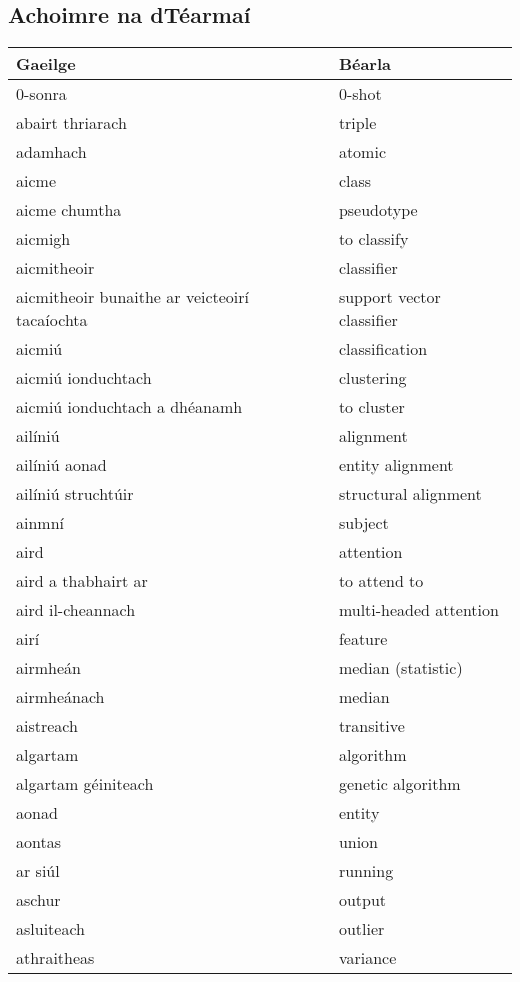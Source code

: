 \subsection{Achoimre na dTéarmaí}
\begin{longtable}{|l|l|}
	\hline
		\textbf{Gaeilge} & \textbf{Béarla}\\ \hline 
		0-sonra&0-shot\\ \hline 
		abairt thriarach&triple\\ \hline 
		adamhach&atomic\\ \hline 
		aicme&class\\ \hline 
		aicme chumtha&pseudotype\\ \hline 
		aicmigh&to classify\\ \hline 
		aicmitheoir&classifier\\ \hline 
		aicmitheoir bunaithe ar veicteoirí tacaíochta&support vector classifier\\ \hline 
		aicmiú&classification\\ \hline 
		aicmiú ionduchtach&clustering\\ \hline 
		aicmiú ionduchtach a dhéanamh&to cluster\\ \hline 
		ailíniú&alignment\\ \hline 
		ailíniú aonad&entity alignment\\ \hline 
		ailíniú struchtúir&structural alignment\\ \hline 
		ainmní&subject\\ \hline 
		aird&attention\\ \hline 
		aird a thabhairt ar&to attend to\\ \hline 
		aird il-cheannach&multi-headed attention\\ \hline 
		airí&feature\\ \hline 
		airmheán&median (statistic)\\ \hline 
		airmheánach&median\\ \hline 
		aistreach&transitive\\ \hline 
		algartam&algorithm\\ \hline 
		algartam géiniteach&genetic algorithm\\ \hline 
		aonad&entity\\ \hline 
		aontas&union\\ \hline 
		ar siúl&running\\ \hline 
		aschur&output\\ \hline 
		asluiteach&outlier\\ \hline 
		athraitheas&variance\\ \hline 

\end{longtable}
